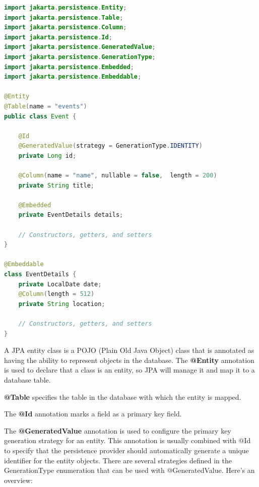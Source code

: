 \begin{lstlisting}[frame=single,language=java]
import jakarta.persistence.Entity;
import jakarta.persistence.Table;
import jakarta.persistence.Column;
import jakarta.persistence.Id;
import jakarta.persistence.GeneratedValue;
import jakarta.persistence.GenerationType;
import jakarta.persistence.Embedded;
import jakarta.persistence.Embeddable;

@Entity
@Table(name = "events")
public class Event {

    @Id
    @GeneratedValue(strategy = GenerationType.IDENTITY)
    private Long id;

    @Column(name = "name", nullable = false,  length = 200)
    private String title;

    @Embedded
    private EventDetails details;

    // Constructors, getters, and setters
}

@Embeddable
class EventDetails {
    private LocalDate date;
    @Column(length = 512)
    private String location;

    // Constructors, getters, and setters
}
\end{lstlisting}

A JPA entity class is a POJO (Plain Old Java Object) class  that is annotated as having the ability to represent objects in the database.
The \textbf{@Entity} annotation is used to declare that a class is an entity, so JPA will manage it and map it to a database table.

\textbf{@Table} specifies the table in the database with which the entity is mapped.

The \textbf{@Id} annotation marks a field as a primary key field.

The \textbf{@GeneratedValue} annotation is used to configure the primary key generation strategy for an entity. This annotation is usually combined with @Id to specify that the persistence provider should automatically generate a unique identifier for the entity objects. There are several strategies defined in the GenerationType enumeration that can be used with @GeneratedValue. Here's an overview:

